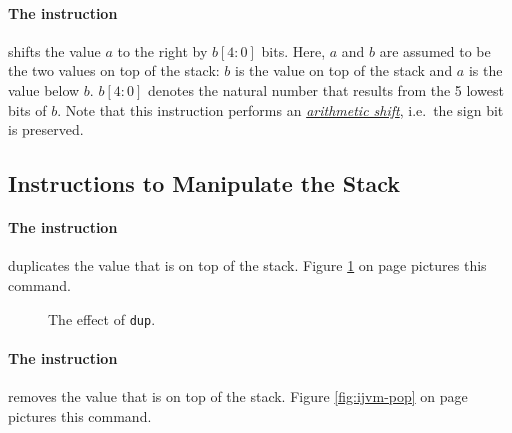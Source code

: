 \paragraph{The instruction }
shifts the value $a$ to the right by $b[4:0]$ bits.  Here, $a$ and $b$ are assumed to be the two
values on top of the stack:  $b$ is the value on top of the stack and $a$ is the value below $b$.
$b[4:0]$ denotes the natural number that results from the 5 lowest bits of $b$.  
Note that this instruction performs an 
\href{http://en.wikipedia.org/wiki/Arithmetic_shift}{\emph{arithmetic shift}}, 
i.e.~the sign bit is preserved.

\subsection{Instructions to Manipulate the Stack}

\paragraph{The instruction }
duplicates the value that is on top of the stack.  Figure \ref{fig:ijvm-dup} on page
\pageref{fig:ijvm-dup} pictures this command.

\setlength{\unitlength}{0.5cm}
\begin{figure}[!ht]
  \centering
{}
  \caption{The effect of \texttt{dup}.}
  \label{fig:ijvm-dup}
\end{figure}


\paragraph{The instruction }
removes the value that is on top of the stack.  Figure \ref{fig:ijvm-pop} on page
\pageref{fig:ijvm-pop} pictures this command.


